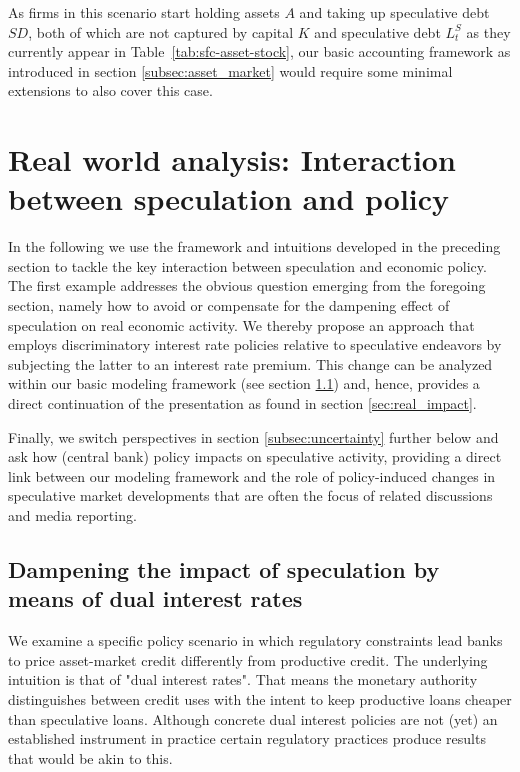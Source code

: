 \documentclass[12pt,a4paper]{article}
\begin{document}
As firms in this scenario start holding assets $A$ and taking up speculative debt $SD$, both of which are not captured by capital $K$ and speculative debt $L_t^S$ as they currently appear in Table~\ref{tab:sfc-asset-stock}, our basic accounting framework as introduced in section \ref{subsec:asset_market} would require some minimal extensions to also cover this case.


\section{Real world analysis: Interaction between speculation and policy} \label{sec:real_world}

In the following we use the framework and intuitions developed in the preceding section to tackle the key interaction between speculation and economic policy. The first example addresses the obvious question emerging from the foregoing section, namely how to avoid or compensate for the dampening effect of speculation on real economic activity. We thereby propose an approach that employs discriminatory interest rate policies relative to speculative endeavors by subjecting the latter to an interest rate premium. This change can be analyzed within our basic modeling framework (see section \ref{subsec:dual_interest}) and, hence, provides a direct continuation of the presentation as found in section \ref{sec:real_impact}.

Finally, we switch perspectives in section \ref{subsec:uncertainty} further below and ask how (central bank) policy impacts on speculative activity, providing a direct link between our modeling framework and the role of policy-induced changes in speculative market developments that are often the focus of related discussions and media reporting.

\subsection{Dampening the impact of speculation by means of dual interest rates} \label{subsec:dual_interest}

We examine a specific policy scenario in which regulatory constraints lead banks to price asset-market credit differently from productive credit.
The underlying intuition is that of "dual interest rates". That means the monetary authority distinguishes between credit uses with the intent to keep productive loans cheaper than speculative loans.
Although concrete dual interest policies are not (yet) an established instrument in practice certain regulatory practices produce results that would be akin to this.
\end{document}
